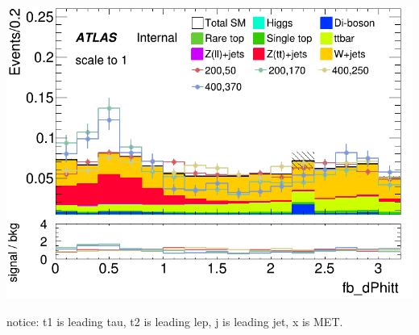 \documentclass[usenames,dvipsnames]{beamer}
\begin{document}
\begin{frame}
\begin{minipage}{0.32\textwidth}
        \includegraphics[width=\textwidth]{graphics/LH_met_sig/LH_fb_dPhitt_norm.png}
    \end{minipage}
    notice: t1 is leading tau, t2 is leading lep, j is leading jet, x is MET.
\end{frame}
\end{document}
